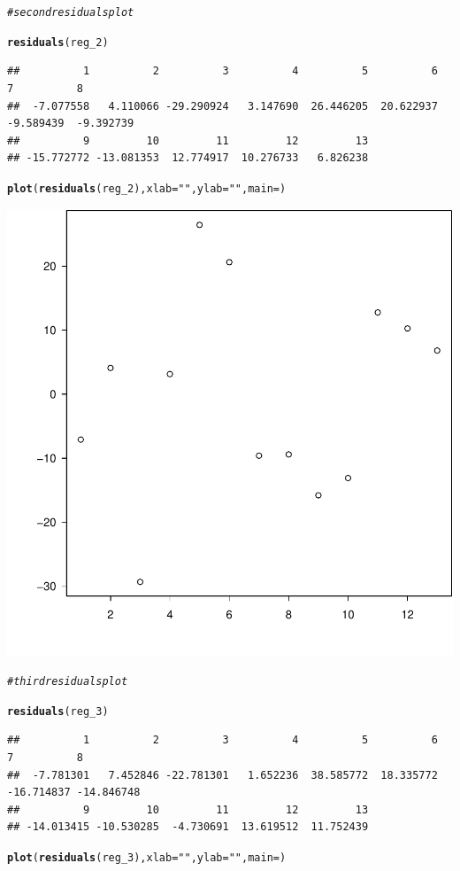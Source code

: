 \documentclass{article}\usepackage[]{graphicx}\usepackage[]{color}
\makeatletter
\newcommand{\hlstr}[1]{\textcolor[rgb]{0.192,0.494,0.8}{#1}}%
\newcommand{\hlcom}[1]{\textcolor[rgb]{0.678,0.584,0.686}{\textit{#1}}}%
\newcommand{\hlstd}[1]{\textcolor[rgb]{0.345,0.345,0.345}{#1}}%
\newcommand{\hlkwc}[1]{\textcolor[rgb]{0.333,0.667,0.333}{#1}}%
\newcommand{\hlkwd}[1]{\textcolor[rgb]{0.737,0.353,0.396}{\textbf{#1}}}%
\newenvironment{kframe}{%
 \def\at@end@of@kframe{}%
 \ifinner\ifhmode%
  \def\at@end@of@kframe{\end{minipage}}%
  \begin{minipage}{\columnwidth}%
 \fi\fi%
 \def\FrameCommand##1{\hskip\@totalleftmargin \hskip-\fboxsep
 \colorbox{shadecolor}{##1}\hskip-\fboxsep
     \hskip-\linewidth \hskip-\@totalleftmargin \hskip\columnwidth}%
 \MakeFramed {\advance\hsize-\width
   \@totalleftmargin\z@ \linewidth\hsize
   \@setminipage}}%
 {\par\unskip\endMakeFramed%
 \at@end@of@kframe}
\newenvironment{knitrout}{}{} %
\makeatother
\begin{document}
\begin{knitrout}
{}


\begin{kframe}\begin{alltt}
\hlcom{# second residuals plot }

\hlkwd{residuals}\hlstd{(reg_2)}
\end{alltt}
\begin{verbatim}
##          1          2          3          4          5          6          7          8 
##  -7.077558   4.110066 -29.290924   3.147690  26.446205  20.622937  -9.589439  -9.392739 
##          9         10         11         12         13 
## -15.772772 -13.081353  12.774917  10.276733   6.826238
\end{verbatim}
\begin{alltt}
\hlkwd{plot}\hlstd{(}\hlkwd{residuals}\hlstd{(reg_2),}\hlkwc{xlab}\hlstd{=}\hlstr{" "}\hlstd{,}\hlkwc{ylab}\hlstd{=}\hlstr{" "}\hlstd{,}\hlkwc{main}\hlstd{=)}
\end{alltt}
\end{kframe}

{\centering \includegraphics[width=.6\linewidth]{figure/problem-3-mid-term-Rnwauto-report-2} 

}


\begin{kframe}\begin{alltt}
\hlcom{# third residuals plot }

\hlkwd{residuals}\hlstd{(reg_3)}
\end{alltt}
\begin{verbatim}
##          1          2          3          4          5          6          7          8 
##  -7.781301   7.452846 -22.781301   1.652236  38.585772  18.335772 -16.714837 -14.846748 
##          9         10         11         12         13 
## -14.013415 -10.530285  -4.730691  13.619512  11.752439
\end{verbatim}
\begin{alltt}
\hlkwd{plot}\hlstd{(}\hlkwd{residuals}\hlstd{(reg_3),}\hlkwc{xlab}\hlstd{=}\hlstr{" "}\hlstd{,}\hlkwc{ylab}\hlstd{=}\hlstr{" "}\hlstd{,}\hlkwc{main}\hlstd{=)}
\end{alltt}
\end{kframe}


\end{knitrout}
\end{document}
